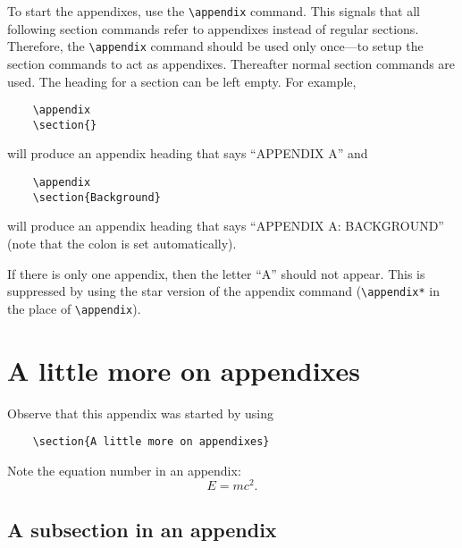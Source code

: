 \documentclass[%
 reprint,
 amsmath,amssymb,
 aps,
]{revtex4-2}
\begin{document}
    To start the appendixes, use the \verb+\appendix+ command.
    This signals that all following section commands refer to appendixes
    instead of regular sections. Therefore, the \verb+\appendix+ command
    should be used only once---to setup the section commands to act as
    appendixes. Thereafter normal section commands are used. The heading
    for a section can be left empty. For example,
    \begin{verbatim}
    \appendix
    \section{}
    \end{verbatim}
    will produce an appendix heading that says ``APPENDIX A'' and
    \begin{verbatim}
    \appendix
    \section{Background}
    \end{verbatim}
    will produce an appendix heading that says ``APPENDIX A: BACKGROUND''
    (note that the colon is set automatically).
    
    If there is only one appendix, then the letter ``A'' should not
    appear. This is suppressed by using the star version of the appendix
    command (\verb+\appendix*+ in the place of \verb+\appendix+).
    
    \section{A little more on appendixes}
    
    Observe that this appendix was started by using
    \begin{verbatim}
    \section{A little more on appendixes}
    \end{verbatim}
    
    Note the equation number in an appendix:
    \begin{equation}
    E=mc^2.
    \end{equation}
    
    \subsection{\label{app:subsec}A subsection in an appendix}
    
\end{document}
